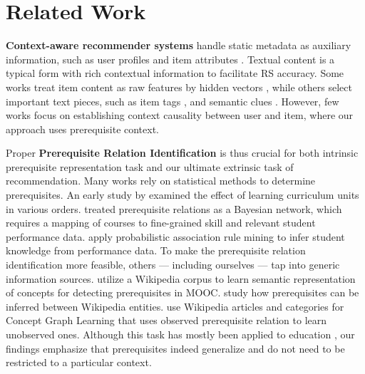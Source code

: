\section{Related Work}
\textbf{Context-aware recommender systems} handle static metadata as auxiliary information, such as user profiles \cite{xu2018graphcar, lei2016comparative}
and item attributes \cite{chen2019personalized}.
Textual content is a typical form with rich contextual information to facilitate RS accuracy. Some works treat item content as raw features by hidden vectors \cite{zheng2017joint, sun2020dual},
while others select important text pieces, such as item tags \cite{gong2016hashtag, li2016hashtag}, and  semantic clues \cite{wang2020fine}.
However, few works focus on establishing context causality between user and item, where our approach uses prerequisite context.

Proper \textbf{Prerequisite Relation Identification} is thus crucial for both intrinsic prerequisite representation task and our ultimate extrinsic task of recommendation. 
Many works rely on statistical methods to determine prerequisites. 
An early study by  \citet{vuong2011method} examined the effect of learning curriculum units in various orders. 
\citet{chen2015discovering} treated prerequisite relations as a Bayesian network, which requires a mapping of courses to fine-grained skill and relevant student performance data. 
\citet{chen2016joint} apply probabilistic association rule mining to infer student knowledge from performance data.  
To make the prerequisite relation identification more feasible, others --- including ourselves --- tap into generic information sources. 
\citet{pan2017prerequisite} utilize a Wikipedia corpus to learn semantic representation of concepts for detecting prerequisites in MOOC. \citet{talukdar2012crowdsourced} study how prerequisites can be inferred between Wikipedia entities. \citet{wang2016using} use Wikipedia articles and categories for Concept Graph Learning that uses observed prerequisite relation to learn unobserved ones.
Although this task has mostly been applied to education \cite{yang2015concept}, our findings emphasize that prerequisites indeed generalize and do not need to be restricted to a particular context.  